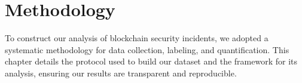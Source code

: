 \section{Methodology}
\label{sec:methodology}

To construct our analysis of blockchain security incidents, we adopted a systematic methodology for data collection, labeling, and quantification. This chapter details the protocol used to build our dataset and the framework for its analysis, ensuring our results are transparent and reproducible.






